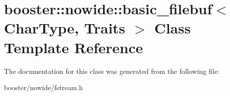 \section{booster\-:\-:nowide\-:\-:basic\-\_\-filebuf$<$ Char\-Type, Traits $>$ Class Template Reference}
\label{classbooster_1_1nowide_1_1basic__filebuf}


The documentation for this class was generated from the following file\-:\begin{DoxyCompactItemize}
\item 
booster/nowide/fstream.\-h\end{DoxyCompactItemize}

